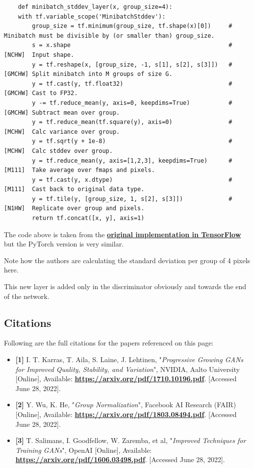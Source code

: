 \begin{lstlisting}
    def minibatch_stddev_layer(x, group_size=4):
    with tf.variable_scope('MinibatchStddev'):
        group_size = tf.minimum(group_size, tf.shape(x)[0])     # Minibatch must be divisible by (or smaller than) group_size.
        s = x.shape                                             # [NCHW]  Input shape.
        y = tf.reshape(x, [group_size, -1, s[1], s[2], s[3]])   # [GMCHW] Split minibatch into M groups of size G.
        y = tf.cast(y, tf.float32)                              # [GMCHW] Cast to FP32.
        y -= tf.reduce_mean(y, axis=0, keepdims=True)           # [GMCHW] Subtract mean over group.
        y = tf.reduce_mean(tf.square(y), axis=0)                # [MCHW]  Calc variance over group.
        y = tf.sqrt(y + 1e-8)                                   # [MCHW]  Calc stddev over group.
        y = tf.reduce_mean(y, axis=[1,2,3], keepdims=True)      # [M111]  Take average over fmaps and pixels.
        y = tf.cast(y, x.dtype)                                 # [M111]  Cast back to original data type.
        y = tf.tile(y, [group_size, 1, s[2], s[3]])             # [N1HW]  Replicate over group and pixels.
        return tf.concat([x, y], axis=1)     
\end{lstlisting}
The code above is taken from the \href{https://github.com/tkarras/progressive_growing_of_gans/blob/master/networks.py\#L127}{\textbf{original implementation in TensorFlow}} but the PyTorch version is very similar. \newline

Note how the authors are calculating the standard deviation per group of 4 pixels here.\newline

This new layer is added only in the discriminator obviously and towards the end of the network.

\subsection{Citations}
Following are the full citations for the papers referenced on this page:
\begin{itemize}
    \item \textbf{[1]} I. T. Karras, T. Aila, S. Laine, J. Lehtinen, "\textit{Progressive Growing GANs for Improved Quality, Stability, and Variation}", NVIDIA, Aalto University [Online], Available: \href{https://arxiv.org/pdf/1710.10196.pdf}{\textbf{https://arxiv.org/pdf/1710.10196.pdf}}. [Accessed June 28, 2022].
    \item \textbf{[2]} Y. Wu, K. He, "\textit{Group Normalization}", Facebook AI Research (FAIR) [Online], Available: \href{https://arxiv.org/pdf/1803.08494.pdf}{\textbf{https://arxiv.org/pdf/1803.08494.pdf}}. [Accessed June 28, 2022].
    \item \textbf{[3]} T. Salimans, I. Goodfellow, W. Zaremba, et al, "\textit{Improved Techniques for Training GANs}", OpenAI [Online], Available: \href{https://arxiv.org/pdf/1606.03498.pdf}{\textbf{https://arxiv.org/pdf/1606.03498.pdf}}. [Accessed June 28, 2022].
\end{itemize}

